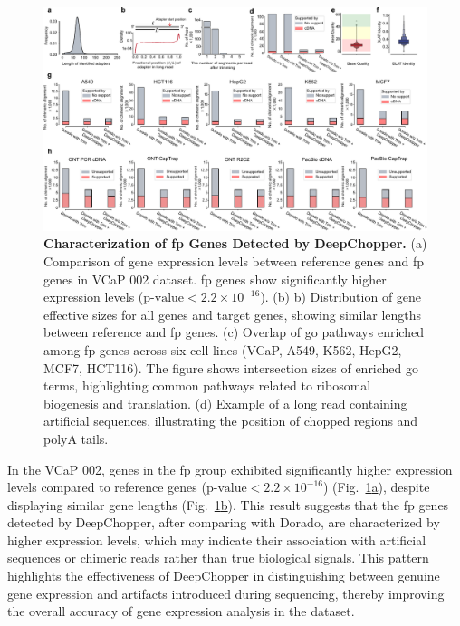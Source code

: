 \documentclass[pdflatex, sn-mathphys-num, lineno]{sn-jnl}%
\newcommand{\figref}[2]{Fig.~\hyperref[#1]{\ref*{#1}#2}}
\theoremstyle{thmstyleone}%
\theoremstyle{thmstyletwo}%
\theoremstyle{thmstylethree}%
\begin{document}
\begin{figure}[!h]
    \includegraphics[height=1.2\columnwidth]{figures/finals/figure2}
    \caption{{\bf Characterization of \gls{fp} Genes Detected by DeepChopper.} (a) Comparison of gene expression levels between reference genes and \gls{fp} genes in VCaP 002 dataset. \gls{fp} genes show significantly higher expression levels (\(\textrm{p-value} < 2.2 \times 10^{-16}\)). (b) b) Distribution of gene effective sizes for all genes and target genes, showing similar lengths between reference and \gls{fp} genes. (c) Overlap of \gls{go} pathways enriched among \gls{fp} genes across six cell lines (VCaP, A549, K562, HepG2, MCF7, HCT116). The figure shows intersection sizes of enriched \gls{go} terms, highlighting common pathways related to ribosomal biogenesis and translation. (d) Example of a long read containing artificial sequences, illustrating the position of chopped regions and polyA tails.}\label{fig:f2}
\end{figure}

In the VCaP 002, genes in the \gls{fp} group exhibited significantly higher expression levels compared to reference genes (\(\textrm{p-value} < 2.2 \times 10^{-16}\)) (\figref{fig:f2}{a}), despite displaying similar gene lengths (\figref{fig:f2}{b}).
This result suggests that the \gls{fp} genes detected by DeepChopper, after comparing with Dorado, are characterized by higher expression levels, which may indicate their association with artificial sequences or chimeric reads rather than true biological signals.
This pattern highlights the effectiveness of DeepChopper in distinguishing between genuine gene expression and artifacts introduced during sequencing, thereby improving the overall accuracy of gene expression analysis in the dataset.
\end{document}
